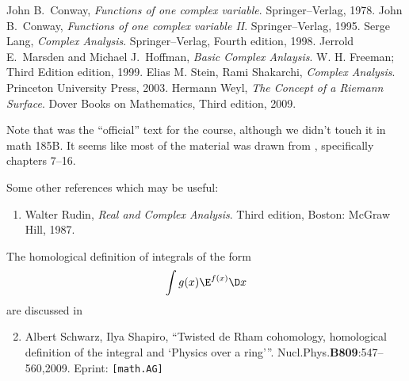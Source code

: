 \begin{thebibliography}{99}
 John B.\ Conway,\newblock 
\emph{Functions of one complex variable}.\newblock 
Springer--Verlag, 1978.
 John B.\ Conway, \newblock
\emph{Functions of one complex variable II}.\newblock
 Springer--Verlag, 1995.
 Serge Lang,\newblock
\emph{Complex Analysis}.\newblock
Springer--Verlag, Fourth edition, 1998.
 Jerrold E.\ Marsden and Michael J.\ Hoffman,\newblock
\emph{Basic Complex Anlaysis}.\newblock
W. H. Freeman; Third Edition edition, 1999.
 Elias M. Stein, Rami Shakarchi, \newblock
\emph{Complex Analysis}.\newblock
Princeton University Press, 2003.
 Hermann Weyl,\newblock
\emph{The Concept of a Riemann Surface}.\newblock
Dover Books on Mathematics, Third edition, 2009.
\end{thebibliography}
Note that \cite{marsden} was the ``official'' text for the course,
although we didn't touch it in math 185B. It seems like most of
the material was drawn from \cite{lang}, specifically chapters 7--16.

Some other references which may be useful:
\begin{enumerate}
\item Walter Rudin, \newblock
\emph{Real and Complex Analysis}.\newblock 
Third edition, Boston: McGraw Hill, 1987.
\end{enumerate}
The homological definition of integrals of the form
\begin{equation*}
\int g(x)\E^{f(x)}\D x
\end{equation*}
are discussed in
\begin{enumerate}\setcounter{enumi}{1}
\item Albert Schwarz, Ilya Shapiro,\newblock
``Twisted de Rham cohomology, homological definition of the
  integral and `Physics over a ring'\thinspace''.\newblock
Nucl.Phys.{\bf B809}:547--560,2009.
Eprint:  \texttt{[math.AG]}
\end{enumerate}
